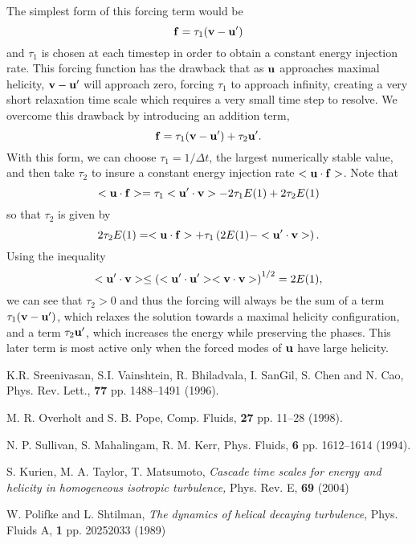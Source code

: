 \documentclass[pre,preprint,showpacs]{revtex4}
\begin{document}
The simplest form of this forcing term would be
\begin{equation}
{\bf f} = \tau_1 ( {\bf v} -  {\bf u'} )
\end{equation}
and $\tau_1$ is chosen at each timestep in order to obtain a constant
energy injection rate.  This forcing function has 
the drawback that as ${\bf u}$ approaches maximal helicity, 
${\bf v} -  {\bf u'}$ will approach zero, forcing 
$\tau_1$ to approach infinity, creating a very short
relaxation time scale which requires a very small time step
to resolve.  We overcome this drawback
by introducing an addition term,
\begin{equation}
{\bf f} = \tau_1 ( {\bf v} -  {\bf u'} )  + \tau_2 {\bf u'}.
\end{equation}
With this form, we can choose $\tau_1 = 1/\Delta t$, 
the largest numerically stable
value, and then take $\tau_2$ to insure a constant energy injection rate
$<   {\bf u} \cdot {\bf f}  > $.
Note that
\begin{equation}
<  {\bf u} \cdot {\bf f} > = \tau_1 < {\bf u'} \cdot {\bf v} >
-  2 \tau_1 E(1)   + 2 \tau_2 E(1)
\end{equation}
so that $\tau_2$ is given by
\begin{equation}
2 \tau_2 E(1)  = < {\bf u} \cdot {\bf f} >  +  
 \tau_1  \left( 2 E(1)    -    <  {\bf u'} \cdot {\bf v} >  \right ).
\end{equation}
Using the inequality
\begin{equation}
<  {\bf u'} \cdot {\bf v} > \le \left( <  {\bf u'} \cdot  {\bf u'} > 
                                <   {\bf v} \cdot  {\bf v} > \right)^{1/2} = 2 E(1),
\end{equation}
we can see that $\tau_2>0$ and thus the forcing will always be the sum
of a term $\tau_1 ( {\bf v} -  {\bf u'} )$, 
which relaxes the solution towards a maximal helicity configuration, 
and a term $ \tau_2 {\bf u'}$, 
which increases the energy while preserving the phases.  This later
term is most active only when the forced modes of ${\bf u}$ have 
large helicity.  

\begin{thebibliography}{99}

 K.R. Sreenivasan, S.I. Vainshtein, R. Bhiladvala, 
I. SanGil, S. Chen and N. Cao, Phys. Rev. Lett., {\bf 77} pp. 1488--1491 
(1996). 

  M. R. Overholt and S. B. Pope,
Comp. Fluids, {\bf 27} pp. 11--28 (1998).   

  N. P. Sullivan, S. Mahalingam, R. M. Kerr,
Phys. Fluids, {\bf 6} pp. 1612--1614 (1994).  

  S. Kurien, M. A. Taylor, T. Matsumoto,
{\it Cascade time scales for energy and helicity in homogeneous
isotropic turbulence,}  Phys. Rev. E, {\bf 69} (2004) 

 W. Polifke and L. Shtilman, 
{\it The dynamics of helical decaying turbulence},
Phys. Fluids A, {\bf  1} pp. 2025­2033 (1989) 


\end{thebibliography}
\end{document}
